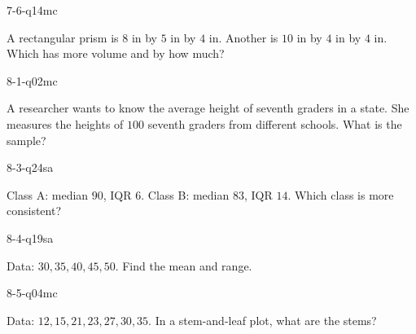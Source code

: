 \begin{practiceQuestion}{7-6-q14}{mc}
\begin{questionText}
A rectangular prism is $8$ in by $5$ in by $4$ in. Another is $10$ in by $4$ in by $4$ in. Which has more volume and by how much?
\end{questionText}
\end{practiceQuestion}

\begin{practiceQuestion}{8-1-q02}{mc}
\begin{questionText}
A researcher wants to know the average height of seventh graders in a state. She measures the heights of $100$ seventh graders from different schools. What is the sample?
\end{questionText}
\end{practiceQuestion}

\begin{practiceQuestion}{8-3-q24}{sa}
\begin{questionText}
Class A: median $90$, IQR $6$. Class B: median $83$, IQR $14$. Which class is more consistent?
\end{questionText}
\end{practiceQuestion}

\begin{practiceQuestion}{8-4-q19}{sa}
\begin{questionText}
Data: $30, 35, 40, 45, 50$. Find the mean and range.
\end{questionText}
\end{practiceQuestion}

\begin{practiceQuestion}{8-5-q04}{mc}
\begin{questionText}
Data: $12, 15, 21, 23, 27, 30, 35$. In a stem-and-leaf plot, what are the stems?
\end{questionText}
\end{practiceQuestion}

